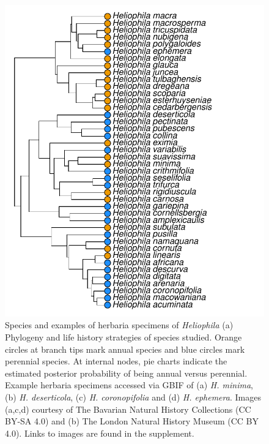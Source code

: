\documentclass[man,floatsintext]{apa6}
\theoremstyle{definition}
\theoremstyle{definition}
\theoremstyle{definition}
\theoremstyle{remark}
\begin{document}
\begin{figure}[!h]
\includegraphics[width=\textwidth]{../figures/phylogeny} \caption{Species and examples of herbaria specimens of
\emph{Heliophila} (a) Phylogeny and life history strategies of species
studied. Orange circles at branch tips mark annual species and blue
circles mark perennial species. At internal nodes, pie charts indicate
the estimated posterior probability of being annual versus perennial.
Example herbaria specimens accessed via GBIF of (a) \emph{H. minima},
(b) \emph{H. deserticola}, (c) \emph{H. coronopifolia} and (d) \emph{H.
ephemera}. Images (a,c,d) courtesy of The Bavarian Natural History
Collections (CC BY-SA 4.0) and (b) The London Natural History Museum (CC
BY 4.0). Links to images are found in the supplement.}\label{fig:phylogeny}
\end{figure}
\end{document}
